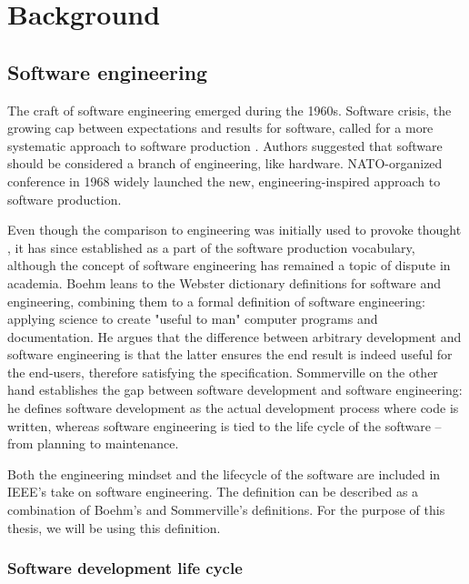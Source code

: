 \chapter{Background}

\section{Software engineering}

The craft of software engineering emerged during the 1960s. Software crisis, the growing cap between expectations and results for software, called for a more systematic approach to software production \cite{mcclure_nato_1968}. Authors suggested that software should be considered a branch of engineering, like hardware. NATO-organized conference in 1968 widely launched the new, engineering-inspired approach to software production.

Even though the comparison to engineering was initially used to provoke thought \cite{mcclure_nato_1968}, it has since established as a part of the software production vocabulary, although the concept of software engineering has remained a topic of dispute in academia. Boehm \cite{boehm_software_1979} leans to the Webster dictionary definitions for software and engineering, combining them to a formal definition of software engineering: applying science to create "useful to man" computer programs and documentation. He argues that the difference between arbitrary development and software engineering is that the latter ensures the end result is indeed useful for the end-users, therefore satisfying the specification.  Sommerville on the other hand establishes the gap between software development and software engineering: he defines software development as the actual development process where code is written, whereas software engineering is tied to the life cycle of the software – from planning to maintenance. \cite{sommerville_software_2016}

Both the engineering mindset and the lifecycle of the software are included in IEEE's take on software engineering. The definition can be described as a combination of Boehm's and Sommerville's definitions. For the purpose of this thesis, we will be using this definition. \cite{noauthor_ieee_1990}

\subsection{Software development life cycle}

